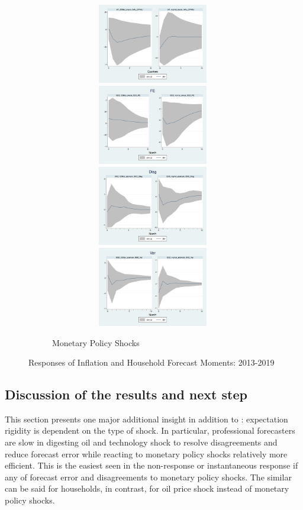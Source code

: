 \documentclass[12pt]{article}
\begin{document}
\begin{figure}[ht]
\begin{subfigure}[b]{0.65\textwidth}
			\caption{Monetary Policy Shocks}
			\includegraphics[width=9cm,height=3.5cm]{figures/CPIAU_ashocksM.png} 
			\smallskip
			\includegraphics[width=9cm,height=3.5cm]{figures/SCEFE_ashocksM.png} 
			\smallskip
			\includegraphics[width=9cm,height=3.5cm]{figures/SCEDisg_ab_ashocksM.png} 
			\smallskip 
			\includegraphics[width=9cm,height=3.5cm]{figures/SCEVar_ab_ashocksM.png} 
		\end{subfigure}
		\caption{ Responses of Inflation and Household Forecast Moments: 2013-2019}
		\label{SCE_IR}
	\end{figure}
	
	
	\subsection{Discussion of the results and next step}
	
	This section presents one major additional insight in addition to \cite{coibion2012can}: expectation rigidity is dependent on the type of shock. In particular, professional forecasters are slow in digesting oil and technology shock to resolve disagreements and reduce forecast error while reacting to monetary policy shocks relatively more efficient. This is the easiest seen in the non-response or instantaneous response if any of forecast error and disagreements to monetary policy shocks. The similar can be said for households, in contrast, for oil price shock instead of monetary policy shocks.
	
\end{document}
